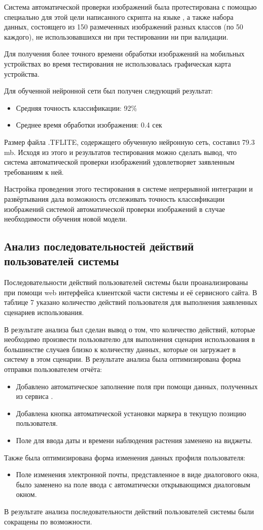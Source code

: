 \tab
Система автоматической проверки изображений была протестирована с помощью специально для этой цели написанного скрипта на языке , а также набора данных, состоящего из 150 размеченных изображений разных классов (по 50 каждого), не использовавшихся ни при тестировании ни при валидации.

\tab
Для получения более точного времени обработки изображений на мобильных устройствах во время тестирования не использовалась графическая карта устройства.

\tab
Для обученной нейронной сети был получен следующий результат:
\begin{itemize}
	\item Средняя точность классификации: 92\%
	\item Среднее время обработки изображения: 0.4 сек
\end{itemize}

\tab
Размер файла .TFLITE, содержащего обученную нейронную сеть, составил 79.3 mb.
Исходя из этого и результатов тестирования можно сделать вывод, что система автоматической проверки изображений удовлетворяет заявленным требованиям к ней.

\tab
Настройка проведения этого тестирования в системе непрерывной интеграции и развёртывания дала возможность отслеживать точность классификации изображений системой автоматической проверки изображений в случае необходимости обучения новой модели.

\subsection{Анализ последовательностей действий пользователей системы}

\tab
Последовательности действий пользователей системы были проанализированы при помощи web интерфейса клиентской части системы и её сервисного сайта.
В таблице 7 указано количество действий пользователя для выполнения заявленных сценариев использования.
\tableseven

\tab
В результате анализа был сделан вывод о том, что количество действий, которые необходимо произвести пользователю для выполнения сценария использования в большинстве случаев близко к количеству данных, которые он загружает в систему в этом сценарии.
В результате анализа была оптимизирована форма отправки пользователем отчёта:
\begin{itemize}
	\item Добавлено автоматическое заполнение поля  при помощи данных, полученных из сервиса .
	\item Добавлена кнопка автоматической установки маркера в текущую позицию пользователя.
	\item Поле для ввода даты и времени наблюдения растения заменено на виджеты.
\end{itemize}
Также была оптимизирована форма изменения данных профиля пользователя:
\begin{itemize}
	\item Поле изменения электронной почты, представленное в виде диалогового окна, было заменено на поле ввода с автоматически открывающимся диалоговым окном.
\end{itemize}

\tab
В результате анализа последовательности действий пользователей системы были сокращены по возможности.
